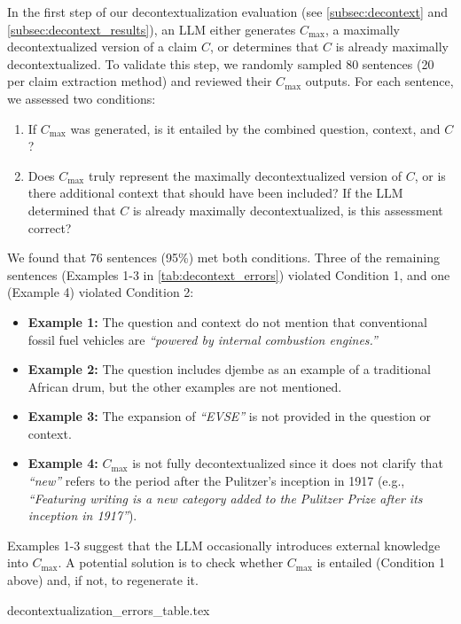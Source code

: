In the first step of our decontextualization evaluation (see \autoref{subsec:decontext} and \autoref{subsec:decontext_results}), an LLM either generates $C_{\max}$, a maximally decontextualized version of a claim $C$, or determines that $C$ is already maximally decontextualized. To validate this step, we randomly sampled 80 sentences (20 per claim extraction method) and reviewed their $C_{\max}$ outputs. For each sentence, we assessed two conditions:
\begin{enumerate}
    \item If $C_{\max}$ was generated, is it entailed by the combined question, context, and $C$?
    \item Does $C_{\max}$ truly represent the maximally decontextualized version of $C$, or is there additional context that should have been included? If the LLM determined that $C$ is already maximally decontextualized, is this assessment correct?
\end{enumerate}

We found that 76 sentences (95\%) met both conditions. Three of the remaining sentences (Examples 1-3 in \autoref{tab:decontext_errors}) violated Condition 1, and one (Example 4) violated Condition 2:
\begin{itemize}
    \item \textbf{Example 1:} The question and context do not mention that conventional fossil fuel vehicles are \textit{``powered by internal combustion engines.''}
    \item \textbf{Example 2:} The question includes djembe as an example of a traditional African drum, but the other examples are not mentioned.
    \item \textbf{Example 3:} The expansion of \textit{``EVSE''} is not provided in the question or context.
    \item \textbf{Example 4:} $C_{\max}$ is not fully decontextualized since it does not clarify that \textit{``new''} refers to the period after the Pulitzer’s inception in 1917 (e.g., \textit{``Featuring writing is a new category added to the Pulitzer Prize after its inception in 1917''}).
\end{itemize}

Examples 1-3 suggest that the LLM occasionally introduces external knowledge into $C_{\max}$. A potential solution is to check whether $C_{\max}$ is entailed (Condition 1 above) and, if not, to regenerate it.


{decontextualization_errors_table.tex}

